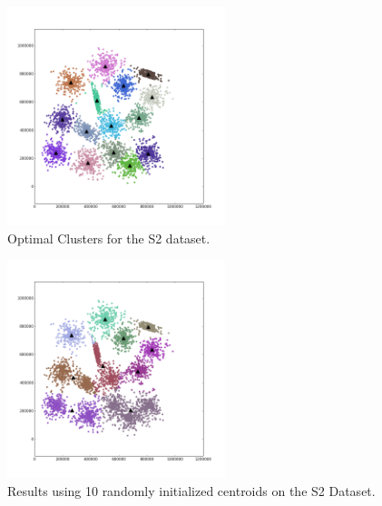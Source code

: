 \documentclass[journal]{IEEEtran}
\begin{document}
\begin{figure}[!t]
	\centering
	\includegraphics[width=2.5in]{../figs/s2_true_euclid_15.png}
	\caption{Optimal Clusters for the S2 dataset.}
	\label{fig_sim}
\end{figure}


\begin{figure}[!t]
	\centering
	\includegraphics[width=2.5in]{../figs/s2_rand_euclid_10.png}
	\caption{Results using 10 randomly initialized centroids on the S2 Dataset.}
	\label{fig_sim}
\end{figure}
\end{document}
